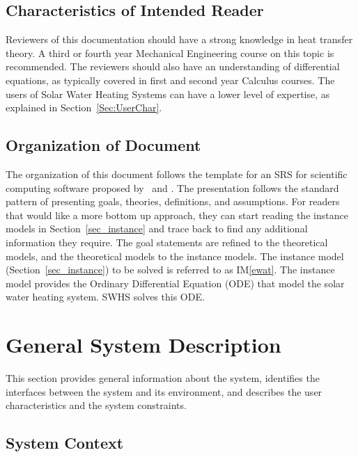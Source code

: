 \documentclass[12pt]{article}
\newcommand{\iref}[1]{IM\ref{#1}}
\begin{document}
\subsection{Characteristics of Intended Reader}
Reviewers of this documentation should have a strong knowledge in heat transfer theory. 
A third or fourth year Mechanical Engineering course on this topic is recommended. The 
reviewers should also have an understanding of differential equations, as typically 
covered in first and second year Calculus courses. The users of Solar Water Heating 
Systems can have a lower level of expertise, as explained in Section~\ref{Sec:UserChar}.

\subsection{Organization of Document}

The organization of this document follows the template for an SRS for scientific 
computing software proposed by~\cite{Koothoor2013} and \cite{SmithAndLai2005}.
The presentation follows the standard pattern of presenting goals, theories, definitions, 
and assumptions. For readers that would like a more bottom up approach, they can start 
reading the instance models in Section~\ref{sec_instance} and trace back to find any 
additional information they require. The goal statements are refined to the theoretical models, 
and the theoretical models to the instance models. The instance model 
(Section~\ref{sec_instance}) to be solved is referred to as \iref{ewat}. The instance model provides 
the Ordinary Differential Equation (ODE) that model the solar water heating system. 
SWHS solves this ODE.


\section{General System Description}

This section provides general information about the system,
identifies the interfaces between the system and its environment, and describes the
user characteristics and the system constraints.

\subsection{System Context}
\end{document}
